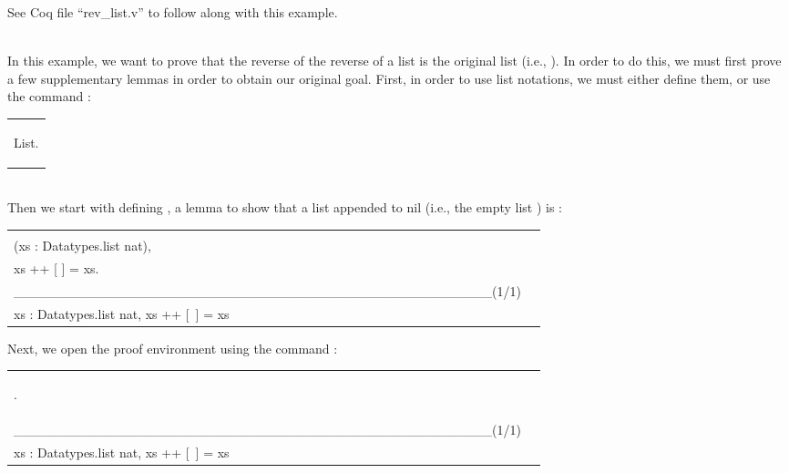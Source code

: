 
See Coq file ``rev\_list.v'' to follow along with this example. 


~\\
In this example, we want to prove that the reverse of the reverse of a list is the original list 
(i.e., ). 
In order to do this, we must first prove a few supplementary lemmas in order to obtain 
our original goal. 
First, in order to use list notations, we must either define them, or use the command 
:

\hspace{-1cm}
\begin{tabular}{l}\begin{code}		\Load List.			\end{code}\end{tabular}

~\\
Then we start with defining , a lemma to show that a list  appended to 
nil (i.e., the empty list \TT{[ ]}) is : 

\hspace{-1cm}
\begin{tabular}{p{8cm} p{8cm}}
\begin{code}
\Lemma \nm{list\_nil} : 			\\
\Forall (xs : Datatypes.list nat),		\\
xs ++ [ ] = xs.	
\end{code}
&
\begin{goal}
1 subgoal	\\
\_\_\_\_\_\_\_\_\_\_\_\_\_\_\_\_\_\_\_\_\_\_\_\_\_\_\_\_\_\_\_\_\_\_\_\_\_\_\_\_\_\_\_\_\_\_\_\_\_\_(1/1)	\\
\Forall xs : Datatypes.list nat, 		
xs ++ [\ ] = xs
\end{goal}
\end{tabular}

\noindent
Next, we open the proof environment using the command : 

\hspace{-1cm}
\begin{tabular}{p{8cm} p{8cm}}
\begin{code}
\Proof.
\end{code}
&
\begin{goal}
1 subgoal	\\
\_\_\_\_\_\_\_\_\_\_\_\_\_\_\_\_\_\_\_\_\_\_\_\_\_\_\_\_\_\_\_\_\_\_\_\_\_\_\_\_\_\_\_\_\_\_\_\_\_\_(1/1)	\\
\Forall xs : Datatypes.list nat, 		
xs ++ [\ ] = xs
\end{goal}
\end{tabular}


